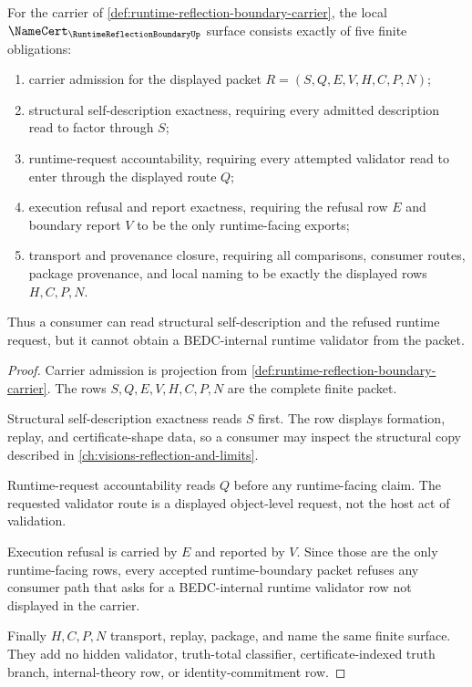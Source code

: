 \begin{theorem}
\label{thm:runtime-reflection-boundary-namecert-obligations}
For the carrier of \autoref{def:runtime-reflection-boundary-carrier}, the local $\NameCert_{\RuntimeReflectionBoundaryUp}$ surface consists exactly of five finite obligations:
\begin{enumerate}
\item carrier admission for the displayed packet $R=(S,Q,E,V,H,C,P,N)$;
\item structural self-description exactness, requiring every admitted description read to factor through $S$;
\item runtime-request accountability, requiring every attempted validator read to enter through the displayed route $Q$;
\item execution refusal and report exactness, requiring the refusal row $E$ and boundary report $V$ to be the only runtime-facing exports;
\item transport and provenance closure, requiring all comparisons, consumer routes, package provenance, and local naming to be exactly the displayed rows $H,C,P,N$.
\end{enumerate}
Thus a consumer can read structural self-description and the refused runtime request, but it cannot obtain a BEDC-internal runtime validator from the packet.
\end{theorem}
\begin{proof}
Carrier admission is projection from \autoref{def:runtime-reflection-boundary-carrier}. The rows $S,Q,E,V,H,C,P,N$ are the complete finite packet.

Structural self-description exactness reads $S$ first. The row displays formation, replay, and certificate-shape data, so a consumer may inspect the structural copy described in \autoref{ch:visions-reflection-and-limits}.

Runtime-request accountability reads $Q$ before any runtime-facing claim. The requested validator route is a displayed object-level request, not the host act of validation.

Execution refusal is carried by $E$ and reported by $V$. Since those are the only runtime-facing rows, every accepted runtime-boundary packet refuses any consumer path that asks for a BEDC-internal runtime validator row not displayed in the carrier.

Finally $H,C,P,N$ transport, replay, package, and name the same finite surface. They add no hidden validator, truth-total classifier, certificate-indexed truth branch, internal-theory row, or identity-commitment row.
\end{proof}

